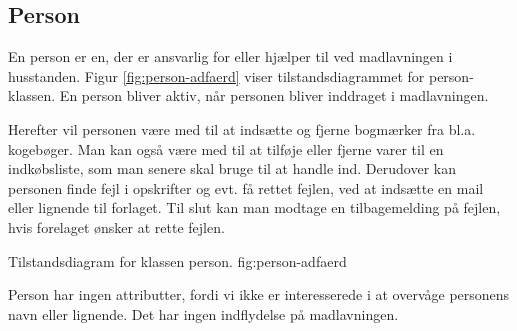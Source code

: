 \subsection{Person}
\label{sec:person}

En person er en, der er ansvarlig for eller hjælper til ved madlavningen i husstanden. Figur \ref{fig:person-adfaerd} viser tilstandsdiagrammet for person-klassen. En person bliver aktiv, når personen bliver inddraget i madlavningen. 

Herefter vil personen være med til at indsætte og fjerne bogmærker fra bl.a. kogebøger. Man kan også være med til at tilføje eller fjerne varer til en indkøbsliste, som man senere skal bruge til at handle ind. Derudover kan personen finde fejl i opskrifter og evt. få rettet fejlen, ved at indsætte en mail eller lignende til forlaget. Til slut kan man modtage en tilbagemelding på fejlen, hvis forelaget ønsker at rette fejlen.

            {Tilstandsdiagram for klassen person.}
            {fig:person-adfaerd}

Person har ingen attributter, fordi vi \fx ikke er interesserede i at overvåge personens navn eller lignende. Det har ingen indflydelse på madlavningen.